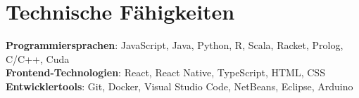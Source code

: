 \documentclass[letterpaper,11pt]{article}
\begin{document}
%
\section{Technische Fähigkeiten}
 \begin{itemize}[leftmargin=0.15in, label={}]
    \small{\item{
     \textbf{Programmiersprachen}{: JavaScript, Java, Python, R, Scala, Racket, Prolog, C/C++, Cuda} \\
     \textbf{Frontend-Technologien}{: React, React Native, TypeScript, HTML, CSS} \\
     \textbf{Entwicklertools}{: Git, Docker, Visual Studio Code, NetBeans, Eclipse, Arduino} \\
    }}
 \end{itemize}


\end{document}
